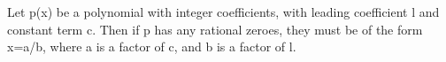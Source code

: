 Let p(x) be a polynomial with integer coefficients,
with leading coefficient l and constant
term c. Then if p has any rational zeroes, they
must be of the form x=a/b, where a is a factor of
c, and b is a factor of l.
